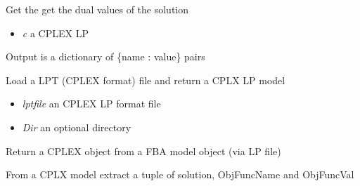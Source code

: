 \documentclass[a4paper,11pt,english]{sphinxmanual}
\begin{document}

\begin{fulllineitems}
\label{modules_doc:cbmpy.CBCPLEX.cplx_getDualValues}
Get the get the dual values of the solution
\begin{itemize}
\item {} 
\emph{c} a CPLEX LP

\end{itemize}

Output is a dictionary of \{name : value\} pairs

\end{fulllineitems}


\begin{fulllineitems}
\label{modules_doc:cbmpy.CBCPLEX.cplx_getModelFromLP}
Load a LPT (CPLEX format) file and return a CPLX LP model
\begin{itemize}
\item {} 
\emph{lptfile} an CPLEX LP format file

\item {} 
\emph{Dir} an optional directory

\end{itemize}

\end{fulllineitems}


\begin{fulllineitems}
\label{modules_doc:cbmpy.CBCPLEX.cplx_getModelFromObj}
Return a CPLEX object from a FBA model object (via LP file)

\end{fulllineitems}


\begin{fulllineitems}
\label{modules_doc:cbmpy.CBCPLEX.cplx_getOptimalSolution}
From a CPLX model extract a tuple of solution, ObjFuncName and ObjFuncVal

\end{fulllineitems}
\end{document}
